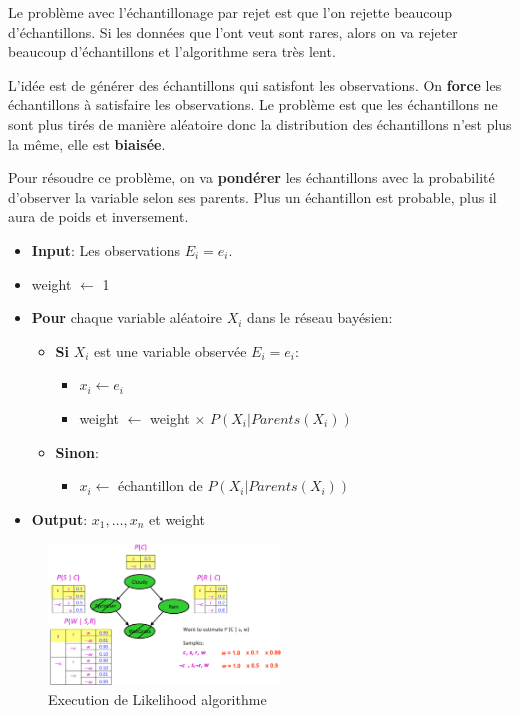 Le problème avec l'échantillonage par rejet est que l'on rejette beaucoup d'échantillons. Si 
les données que l'ont veut sont rares, alors on va rejeter beaucoup d'échantillons et l'algorithme sera très lent.

L'idée est de générer des échantillons qui satisfont les observations. On \textbf{force} les échantillons à satisfaire les observations.
Le problème est que les échantillons ne sont plus tirés de manière aléatoire donc la distribution des échantillons n'est plus la même, elle est \textbf{biaisée}.

Pour résoudre ce problème, on va \textbf{pondérer} les échantillons avec la probabilité d'observer la variable selon ses parents.
Plus un échantillon est probable, plus il aura de poids et inversement.

\newpage
\begin{itemize}[label=\textbullet]
    \item \textbf{Input}: Les observations $E_i=e_i$. 
    \item weight $\leftarrow$ 1
    \item \textbf{Pour} chaque variable aléatoire $X_i$ dans le réseau bayésien:
        \begin{itemize}[label=\textbullet]
            \item \textbf{Si} $X_i$ est une variable observée $E_i=e_i$:
                \begin{itemize}[label=\textbullet]
                    \item $x_i \leftarrow e_i$
                    \item weight $\leftarrow$ weight $\times$ $P(X_i | Parents(X_i))$
                \end{itemize}
            \item \textbf{Sinon}:
                \begin{itemize}[label=\textbullet]
                    \item $x_i \leftarrow$ échantillon de $P(X_i | Parents(X_i))$
                \end{itemize}
        \end{itemize}
    \item \textbf{Output}: $x_1, \dots, x_n$ et weight
\end{itemize}

\begin{figure}[H]
    \begin{center}
        \includegraphics[width=0.55\textwidth]{../pictures/likelihood.png}
    \end{center}
    \caption{Execution de Likelihood algorithme}\label{fig:likelihood}
\end{figure}

